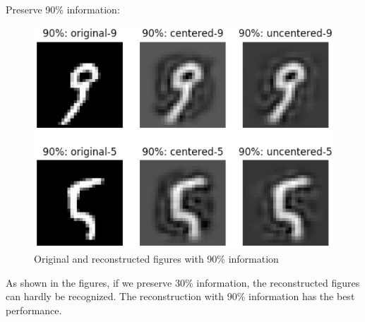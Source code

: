 \documentclass[12pt]{article}
\begin{document}
\par
Preserve 90\% information:
\begin{figure}[ht]
\centering
\includegraphics[scale=0.56]{90.png}
\caption{Original and reconstructed figures with 90\% information}
\end{figure}
\par
As shown in the figures, if we preserve 30\% information, the reconstructed figures can hardly be recognized. The reconstruction with 90\% information has the best performance.
\end{document}

